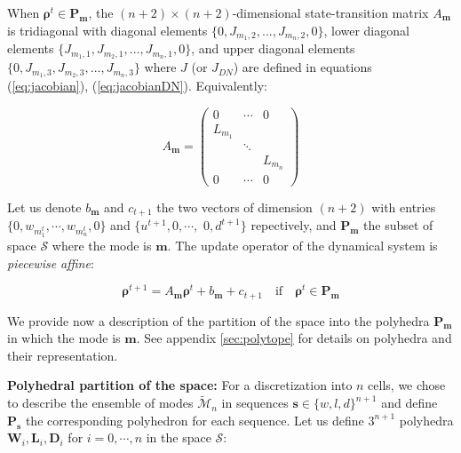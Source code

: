 \noindent When $\boldsymbol\rho^{t}\in\textbf{P}_{\boldsymbol m}$, the $(n+2)\times(n+2)$-dimensional state-transition matrix $A_{\boldsymbol m}$ is tridiagonal with diagonal elements $\{0, J_{m_{1},2},...,J_{m_{n},2},0\}$, lower diagonal elements $\{J_{m_{1},1},J_{m_{2},1},...,J_{m_{n},1},0\}$, and upper diagonal elements $\{0,J_{m_{1},3},J_{m_{2},3},...,J_{m_{n},3}\}$ where $J$ (or $J_{DN}$) are defined in equations (\ref{eq:jacobian}), (\ref{eq:jacobianDN}). Equivalently:

\begin{equation}\label{eq:matrixA}
 A_{\boldsymbol m} =
 \begin{pmatrix}
0 & \cdots & 0 \\
L_{m_{1}} & & \\
& \ddots & \\
& & L_{m_{n}}\\
0 & \cdots & 0
\end{pmatrix}
\end{equation}

\noindent Let us denote $b_{\boldsymbol m}$ and $c_{t+1}$ the two vectors of dimension $(n+2)$ with entries $\{0,w_{m^{t}_{1}},\cdots,w_{m^{t}_{n}},0\}$ and $\{u^{t+1},0,\cdots,$ $0,d^{t+1}\}$ repectively, and $\textbf{P}_{\boldsymbol m}$ the subset of space $\mathcal{S}$ where the mode is $\boldsymbol m$. The update operator of the dynamical system is \emph{piecewise affine}:

\begin{equation}
\boldsymbol\rho^{t+1} = A_{\boldsymbol m} \boldsymbol\rho^{t} + b_{\boldsymbol m} + c_{t+1} \quad\text{if}\quad\boldsymbol\rho^{t}\in\textbf{P}_{\boldsymbol m}
\label{eq:underlyingSystemDN2}
\end{equation}

\noindent We provide now a description of the partition of the space into the polyhedra $\textbf{P}_{\boldsymbol m}$ in which the mode is $\boldsymbol m$. See appendix \ref{sec:polytope} for details on polyhedra and their representation.

\hspace{10mm}

\noindent\textbf{Polyhedral partition of the space:} For a discretization into $n$ cells, we chose to describe the ensemble of modes $\tilde{\mathcal{M}}_{n}$ in sequences $\boldsymbol s \in \{w,l,d\}^{n+1}$ and define $\textbf{P}_{\boldsymbol s}$ the corresponding polyhedron for each sequence. Let us define $3^{n+1}$ polyhedra $\textbf{W}_{i}, \textbf{L}_{i}, \textbf{D}_{i}$ for $i=0,\cdots,n$ in the space $\mathcal{S}$:

